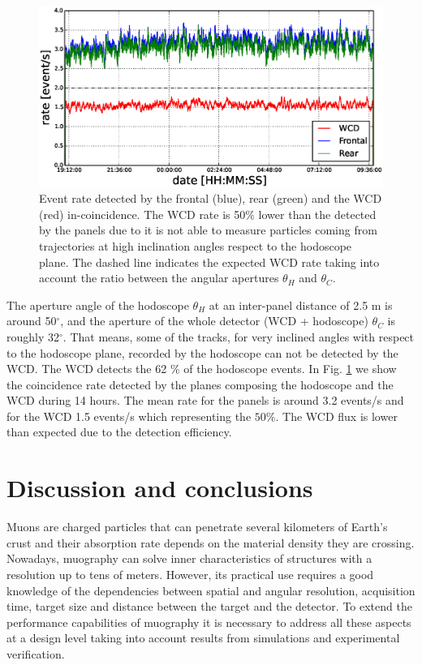 \documentclass[letterpaper,11pt]{article}
\begin{document}
\begin{figure}[htb]
\centering
\includegraphics[width=0.8\columnwidth]{Figures/HodWCDRate.eps}
\caption{Event rate detected by the frontal (blue), rear (green) and the WCD (red) in-coincidence. The WCD rate is 50$\%$ lower than the detected by the panels due to it is not able to measure particles coming from trajectories at high inclination angles respect to the hodoscope plane. The dashed line indicates the expected WCD rate taking into account the ratio between the angular apertures $\theta_H$ and $\theta_C$.}
\label{fig:RateWCDH}
\end{figure}

The aperture angle of the hodoscope $\theta_H$ at an inter-panel distance of 2.5 m is around 50$^{\circ}$, and the aperture of the whole detector (WCD + hodoscope) $\theta_C$ is roughly 32$^{\circ}$. That means, some of the tracks, for very inclined angles with respect to the hodoscope plane, recorded by the hodoscope can not be detected by the WCD. The WCD detects the 62 $\%$ of the hodoscope events. In Fig. \ref{fig:RateWCDH} we show the coincidence rate detected by the planes composing the hodoscope and the WCD during 14 hours. The mean rate for the panels is around 3.2 events/s and for the WCD 1.5 events/s which representing the $50\%$. The WCD flux is lower than expected due to the detection efficiency.


\section{Discussion and conclusions}
\label{conclusions}

Muons are charged particles that can penetrate several kilometers of Earth's crust and their absorption rate depends on the material density they are crossing. Nowadays, muography can solve inner characteristics of structures with a resolution up to tens of meters. However, its practical use requires a good knowledge of the dependencies between spatial and angular resolution, acquisition time, target size and distance between the target and the detector. To extend the performance capabilities of muography it is necessary to address all these aspects at a design level taking into account results from simulations and experimental verification.
\end{document}
